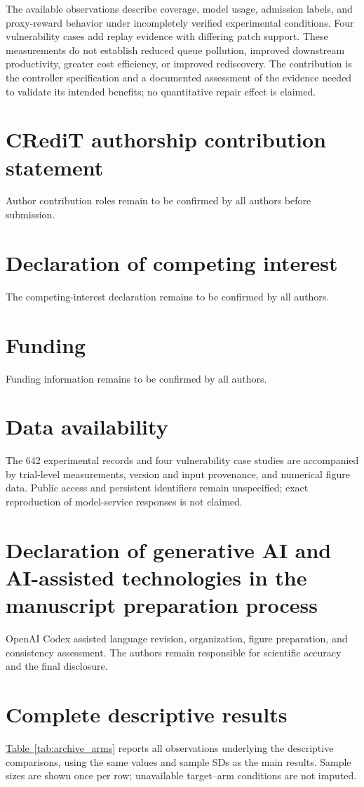\documentclass[final,5p,times,number]{elsarticle}
\newcommand{\namedref}[2]{\hyperref[#2]{#1~\ref*{#2}}}
\begin{document}
The available observations describe coverage, model usage, admission labels, and proxy-reward behavior under incompletely verified experimental conditions. Four vulnerability cases add replay evidence with differing patch support. These measurements do not establish reduced queue pollution, improved downstream productivity, greater cost efficiency, or improved rediscovery. The contribution is the controller specification and a documented assessment of the evidence needed to validate its intended benefits; no quantitative repair effect is claimed.

\section*{CRediT authorship contribution statement}
Author contribution roles remain to be confirmed by all authors before submission.
\section*{Declaration of competing interest}
The competing-interest declaration remains to be confirmed by all authors.
\section*{Funding}
Funding information remains to be confirmed by all authors.
\section*{Data availability}
The 642 experimental records and four vulnerability case studies are accompanied by trial-level measurements, version and input provenance, and numerical figure data. Public access and persistent identifiers remain unspecified; exact reproduction of model-service responses is not claimed.
\section*{Declaration of generative AI and AI-assisted technologies in the manuscript preparation process}
OpenAI Codex assisted language revision, organization, figure preparation, and consistency assessment. The authors remain responsible for scientific accuracy and the final disclosure.

\appendix
\setcounter{table}{0}
\renewcommand{\theHtable}{appendix.\Alph{section}.\arabic{table}}
\section{Complete descriptive results}
\label{sec:archive_appendix}
\namedref{Table}{tab:archive_arms} reports all observations underlying the descriptive comparisons, using the same values and sample SDs as the main results. Sample sizes are shown once per row; unavailable target--arm conditions are not imputed.




\end{document}
